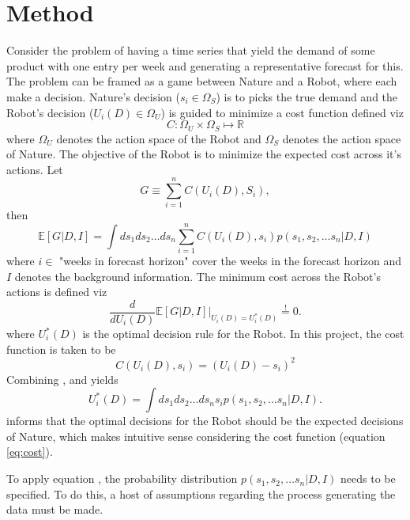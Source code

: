 \section{Method}
\label{sec:method}
Consider the problem of having a time series that yield the demand of some product with one entry per week and generating a representative forecast for this. The problem can be framed as a game between Nature and a Robot, where each make a decision. Nature's decision ($s_i\in \Omega_S$) is to picks the true demand and the Robot's decision ($U_i(D)\in \Omega_U$) is guided to minimize a cost function defined viz 
\begin{equation}
	C:\Omega_U\times \Omega_S \mapsto \mathbb{R} 
\end{equation}
where $\Omega_U$ denotes the action space of the Robot and $\Omega_S$ denotes the action space of Nature. The objective of the Robot is to minimize the expected cost across it's actions. Let
\begin{equation}
	G\equiv \sum_{i=1}^n C(U_i(D),S_i),
\end{equation}
then
\begin{equation}
	\mathbb{E}[G|D,I] = \int ds_1ds_2\dots ds_n \sum_{i=1}^nC(U_i(D),s_i)p(s_1,s_2,\dots s_n|D,I)
	\label{eq:pen}
\end{equation}
where $i\in$ "weeks in forecast horizon" cover the weeks in the forecast horizon and $I$ denotes the background information. The minimum cost across the Robot's actions is defined viz
\begin{equation}
	\frac{d}{dU_i(D)}\mathbb{E}[G|D,I]\bigg|_{U_i(D) = U_i^*(D)} \stackrel{!}{=}0.
	\label{eq:crit}
\end{equation}
where $U^*_i(D)$ is the optimal decision rule for the Robot. In this project, the cost function is taken to be
\begin{equation}
	C(U_i(D),s_i) = (U_i(D)-s_i)^2
	\label{eq:cost}
\end{equation} 
Combining ,  and  yields 
\begin{equation}
	U^*_i(D) = \int ds_1ds_2\dots ds_n s_ip(s_1,s_2,\dots s_n|D,I).
	\label{eq:decision_rule}
\end{equation}
 informs that the optimal decisions for the Robot should be the expected decisions of Nature, which makes intuitive sense considering the cost function (equation \eqref{eq:cost}).

To apply equation , the probability distribution $p(s_1,s_2,\dots s_n|D,I)$ needs to be specified. To do this, a host of assumptions regarding the process generating the data must be made.

